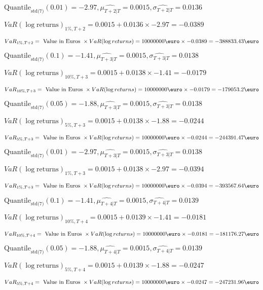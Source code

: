 $\text{Quantile}_\text{std(7)}(0.01) = -2.97,\hat{\mu_{T+2|T}} = 0.0015, \hat{\sigma_{T+2|T}} = 0.0136$

$VaR(\log \text{returns})_{1\%, T + 2} = 0.0015 + 0.0136\times-2.97 = -0.0389$

$VaR_{1\%, T + 2} = \text{ Value in Euros } \times VaR(\log returns) = 10 000 000 \text{\euro} \times-0.0389 = -388833.43 \text{\euro}$


$\text{Quantile}_\text{std(7)}(0.1) = -1.41,\hat{\mu_{T+3|T}} = 0.0015, \hat{\sigma_{T+3|T}} = 0.0138$

$VaR(\log \text{returns})_{10\%, T + 3} = 0.0015 + 0.0138\times-1.41 = -0.0179$

$VaR_{10\%, T + 3} = \text{ Value in Euros } \times VaR(\log returns) = 10 000 000 \text{\euro} \times-0.0179 = -179053.2 \text{\euro}$


$\text{Quantile}_\text{std(7)}(0.05) = -1.88,\hat{\mu_{T+3|T}} = 0.0015, \hat{\sigma_{T+3|T}} = 0.0138$

$VaR(\log \text{returns})_{5\%, T + 3} = 0.0015 + 0.0138\times-1.88 = -0.0244$

$VaR_{5\%, T + 3} = \text{ Value in Euros } \times VaR(\log returns) = 10 000 000 \text{\euro} \times-0.0244 = -244391.47 \text{\euro}$


$\text{Quantile}_\text{std(7)}(0.01) = -2.97,\hat{\mu_{T+3|T}} = 0.0015, \hat{\sigma_{T+3|T}} = 0.0138$

$VaR(\log \text{returns})_{1\%, T + 3} = 0.0015 + 0.0138\times-2.97 = -0.0394$

$VaR_{1\%, T + 3} = \text{ Value in Euros } \times VaR(\log returns) = 10 000 000 \text{\euro} \times-0.0394 = -393567.64 \text{\euro}$


$\text{Quantile}_\text{std(7)}(0.1) = -1.41,\hat{\mu_{T+4|T}} = 0.0015, \hat{\sigma_{T+4|T}} = 0.0139$

$VaR(\log \text{returns})_{10\%, T + 4} = 0.0015 + 0.0139\times-1.41 = -0.0181$

$VaR_{10\%, T + 4} = \text{ Value in Euros } \times VaR(\log returns) = 10 000 000 \text{\euro} \times-0.0181 = -181176.27 \text{\euro}$


$\text{Quantile}_\text{std(7)}(0.05) = -1.88,\hat{\mu_{T+4|T}} = 0.0015, \hat{\sigma_{T+4|T}} = 0.0139$

$VaR(\log \text{returns})_{5\%, T + 4} = 0.0015 + 0.0139\times-1.88 = -0.0247$

$VaR_{5\%, T + 4} = \text{ Value in Euros } \times VaR(\log returns) = 10 000 000 \text{\euro} \times-0.0247 = -247231.96 \text{\euro}$



